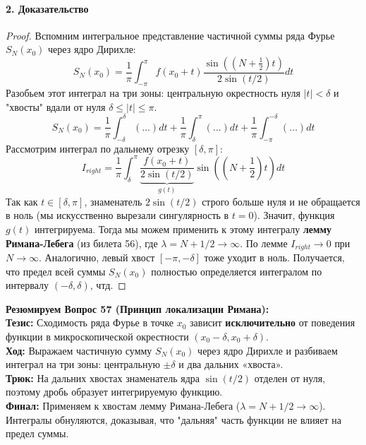 \paragraph{2. Доказательство}
\begin{proof}
Вспомним интегральное представление частичной суммы ряда Фурье $S_N(x_0)$ через ядро Дирихле:
$$ S_N(x_0) = \frac{1}{\pi} \int_{-\pi}^\pi f(x_0+t) \frac{\sin((N+\frac{1}{2})t)}{2 \sin(t/2)} dt $$
Разобьем этот интеграл на три зоны: центральную окрестность нуля $|t| < \delta$ и "хвосты" вдали от нуля $\delta \le |t| \le \pi$.
$$ S_N(x_0) = \frac{1}{\pi} \int_{-\delta}^{\delta} (\dots) dt + \frac{1}{\pi} \int_{\delta}^{\pi} (\dots) dt + \frac{1}{\pi} \int_{-\pi}^{-\delta} (\dots) dt $$
Рассмотрим интеграл по дальнему отрезку $[\delta, \pi]$:
$$ I_{right} = \frac{1}{\pi} \int_{\delta}^{\pi} \underbrace{\frac{f(x_0+t)}{2 \sin(t/2)}}_{g(t)} \sin\left(\left(N+\frac{1}{2}\right)t\right) dt $$
Так как $t \in [\delta, \pi]$, знаменатель $2 \sin(t/2)$ строго больше нуля и не обращается в ноль (мы искусственно вырезали сингулярность в $t=0$). Значит, функция $g(t)$ интегрируема. 
Тогда мы можем применить к этому интегралу \textbf{лемму Римана-Лебега} (из билета 56), где $\lambda = N + 1/2 \to \infty$. По лемме $I_{right} \to 0$ при $N \to \infty$.
Аналогично, левый хвост $[-\pi, -\delta]$ тоже уходит в ноль. 
Получается, что предел всей суммы $S_N(x_0)$ полностью определяется интегралом по интервалу $(-\delta, \delta)$, чтд.
\end{proof}
\begin{tcolorbox}[colback=gray!5, colframe=black, boxrule=0.5pt, arc=0pt]
\textbf{Резюмируем Вопрос 57 (Принцип локализации Римана):} \\
\textbf{Тезис:} Сходимость ряда Фурье в точке $x_0$ зависит \textbf{исключительно} от поведения функции в микроскопической окрестности $(x_0-\delta, x_0+\delta)$. \\
\textbf{Ход:} Выражаем частичную сумму $S_N(x_0)$ через ядро Дирихле и разбиваем интеграл на три зоны: центральную $\pm\delta$ и два дальних «хвоста». \\
\textbf{Трюк:} На дальних хвостах знаменатель ядра $\sin(t/2)$ отделен от нуля, поэтому дробь образует интегрируемую функцию. \\
\textbf{Финал:} Применяем к хвостам лемму Римана-Лебега ($\lambda = N + 1/2 \to \infty$). Интегралы обнуляются, доказывая, что "дальняя" часть функции не влияет на предел суммы.
\end{tcolorbox}


